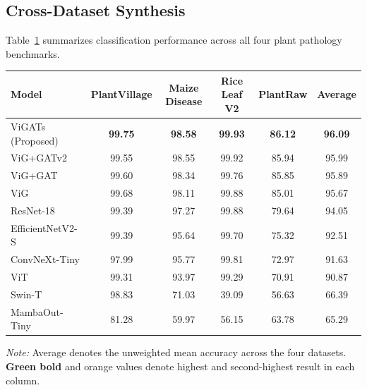 \documentclass[]{interact}
\theoremstyle{plain}
\theoremstyle{definition}
\theoremstyle{remark}
\newcommand{\bestresult}[1]{\textcolor{bestgreen}{\textbf{#1}}}
\newcommand{\secondresult}[1]{\textcolor{secondorange}{#1}}
\begin{document}
\subsection{Cross-Dataset Synthesis}
\label{sec:summary_plant}

Table~\ref{tab:summary_plant} summarizes classification performance across all four plant pathology benchmarks.

\begin{table}[H]
\small
\setlength{\tabcolsep}{4.5pt}
{\begin{tabular}{lccccc} \toprule
\textbf{Model} & \textbf{PlantVillage} & \textbf{Maize Disease} & \textbf{Rice Leaf V2} & \textbf{PlantRaw} & \textbf{Average} \\ \midrule
ViGATs (Proposed) & \bestresult{99.75} & \bestresult{98.58} & \bestresult{99.93} & \bestresult{86.12} & \bestresult{96.09} \\
ViG+GATv2 \citep{brody2022gat} & 99.55 & \secondresult{98.55} & \secondresult{99.92} & \secondresult{85.94} & \secondresult{95.99} \\
ViG+GAT \citep{velickovic2018graph} & 99.60 & 98.34 & 99.76 & 85.85 & 95.89 \\
ViG \citep{han2022vision} & \secondresult{99.68} & 98.11 & 99.88 & 85.01 & 95.67 \\
ResNet-18 \citep{he2016deep} & 99.39 & 97.27 & 99.88 & 79.64 & 94.05 \\
EfficientNetV2-S \citep{tan2021efficientnetv2} & 99.39 & 95.64 & 99.70 & 75.32 & 92.51 \\
ConvNeXt-Tiny \citep{liu2022convnext} & 97.99 & 95.77 & 99.81 & 72.97 & 91.63 \\
ViT \citep{dosovitskiy2020image} & 99.31 & 93.97 & 99.29 & 70.91 & 90.87 \\
Swin-T \citep{liu2021swin} & 98.83 & 71.03 & 39.09 & 56.63 & 66.39 \\
MambaOut-Tiny \citep{yu2024mambaout} & 81.28 & 59.97 & 56.15 & 63.78 & 65.29 \\
\bottomrule
\end{tabular}}
\label{tab:summary_plant}
\parbox{\textwidth}{\vspace{2pt}\footnotesize\textit{Note:} Average denotes the unweighted mean accuracy across the four datasets. \bestresult{Green bold} and \secondresult{orange} values denote highest and second-highest result in each column.}
\end{table}
\end{document}
